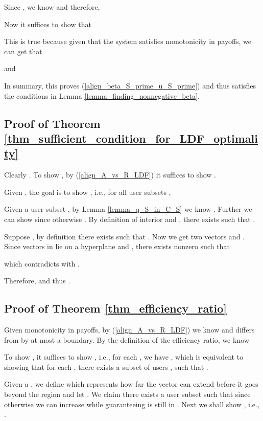 \documentclass[prodmode,acmtompecs]{acmsmall}
\begin{document}
Since , we know  and therefore, 


Now it suffices to show that


This is true because given that the system satisfies monotonicity in payoffs, we can get that

and


In summary, this proves (\ref{align_beta_S_prime_u_S_prime}) and thus  satisfies the conditions in Lemma \ref{lemma_finding_nonnegative_beta}. 

\subsection{Proof of Theorem \ref{thm_sufficient_condition_for_LDF_optimality}}
\label{appendix_pf_thm_sufficient_condition_for_LDF_optimality}

Clearly . 
To show , by (\ref{align_A_vs_R_LDF}) it suffices to show . 

Given , the goal is to show , i.e., for all user subsets , 


Given a user subset , by Lemma \ref{lemma_q_S_in_C_S} we know . Further we can show  since otherwise . By definition of interior and , there exists  such that .  

Suppose , by definition there exists  such that . Now we get two vectors  and . Since vectors in  lie on a hyperplane and , there exists nonzero  such that

which contradicts with . 

Therefore,  and thus . 

\subsection{Proof of Theorem \ref{thm_efficiency_ratio}}
\label{appendix_pf_thm_efficiency_ratio}

Given monotonicity in payoffs, by (\ref{align_A_vs_R_LDF}) we know  and  differs from  by at most a boundary. By the definition of the efficiency ratio, we know


To show , it suffices to show , i.e., for each , we have , which is equivalent to showing that for each , there exists a subset of users , such that . 

Given a , we define  which represents how far the vector  can extend before it goes beyond the region  and let . We claim there exists a user subset  such that  since otherwise we can increase  while guaranteeing  is still in . 
Next we shall show , i.e., . 
\end{document}
